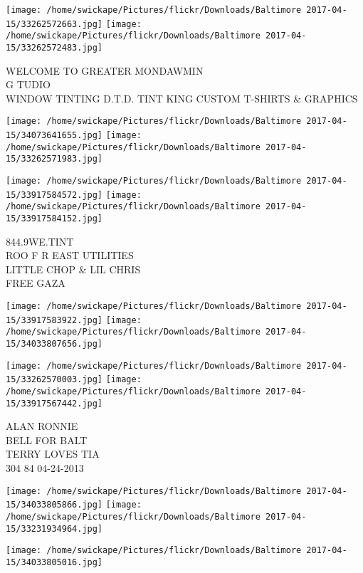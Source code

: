 \documentclass[10pt,letterpaper]{article}
\begin{document}
\vspace{0.25in}
\texttt{[image: /home/swickape/Pictures/flickr/Downloads/Baltimore 2017-04-15/33262572663.jpg]}
\texttt{[image: /home/swickape/Pictures/flickr/Downloads/Baltimore 2017-04-15/33262572483.jpg]}

WELCOME TO GREATER MONDAWMIN\\
G TUDIO\\
WINDOW TINTING D.T.D. TINT KING CUSTOM T{-}SHIRTS \& GRAPHICS\\
\pagebreak

\texttt{[image: /home/swickape/Pictures/flickr/Downloads/Baltimore 2017-04-15/34073641655.jpg]}
\texttt{[image: /home/swickape/Pictures/flickr/Downloads/Baltimore 2017-04-15/33262571983.jpg]}

\texttt{[image: /home/swickape/Pictures/flickr/Downloads/Baltimore 2017-04-15/33917584572.jpg]}
\texttt{[image: /home/swickape/Pictures/flickr/Downloads/Baltimore 2017-04-15/33917584152.jpg]}

844.9WE.TINT\\
ROO F R EAST UTILITIES\\
LITTLE CHOP \& LIL CHRIS\\
FREE GAZA\\
\pagebreak

\texttt{[image: /home/swickape/Pictures/flickr/Downloads/Baltimore 2017-04-15/33917583922.jpg]}
\texttt{[image: /home/swickape/Pictures/flickr/Downloads/Baltimore 2017-04-15/34033807656.jpg]}

\texttt{[image: /home/swickape/Pictures/flickr/Downloads/Baltimore 2017-04-15/33262570003.jpg]}
\texttt{[image: /home/swickape/Pictures/flickr/Downloads/Baltimore 2017-04-15/33917567442.jpg]}

ALAN RONNIE\\
BELL FOR BALT\\
TERRY LOVES TIA\\
304 84 04{-}24{-}2013\\
\pagebreak

\texttt{[image: /home/swickape/Pictures/flickr/Downloads/Baltimore 2017-04-15/34033805866.jpg]}
\texttt{[image: /home/swickape/Pictures/flickr/Downloads/Baltimore 2017-04-15/33231934964.jpg]}

\texttt{[image: /home/swickape/Pictures/flickr/Downloads/Baltimore 2017-04-15/34033805016.jpg]}
\end{document}
